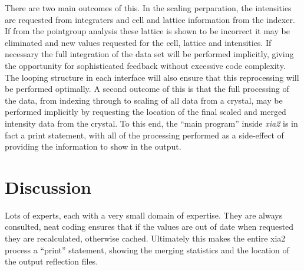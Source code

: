 \documentclass[a4paper,11pt]{article}
\begin{document}
There are two main outcomes of this. In the scaling perparation, 
the intensities are requested from integraters and cell and lattice
information from the indexer. If from the pointgroup analysis these
lattice is shown to be incorrect it may be eliminated and new
values requested for the cell, lattice and intensities. If necessary
the full integration of the data set will be performed implicitly,
giving the opportunity for sophisticated feedback without excessive
code complexity. The looping structure in each interface will also
ensure that this reprocessing will be performed optimally.
A second outcome of this is that the full processing
of the data, from indexing through to scaling of all data from a
crystal, may be performed implicitly by requesting the location of the
final scaled and merged intensity data from the crystal. To this end,
the ``main program'' inside \emph{xia2} is in fact a print statement,
with all of the processing performed as a side-effect of providing the
information to show in the output.

\section{Discussion}

Lots of experts, each with a very small domain of expertise. They are
always consulted, neat coding ensures that if the values are out of
date when requested they are recalculated, otherwise
cached. Ultimately this makes the entire xia2 process a ``print''
statement, showing the merging statistics and the location of the
output reflection files.
\end{document}
